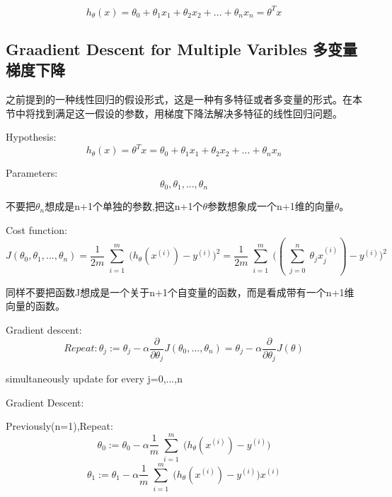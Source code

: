 \documentclass[UTF8]{ctexart}
\begin{document}
\begin{equation*}
  h_\theta(x) = \theta_0 + \theta_1x_1 + \theta_2x_2 + ...+ \theta_nx_n
  =\theta^{T}x
\end{equation*}

\subsection{Graadient Descent for Multiple Varibles 多变量梯度下降}
之前提到的一种线性回归的假设形式，这是一种有多特征或者多变量的形式。在本节中将找到满足这一假设的参数，用梯度下降法解决多特征的线性回归问题。

Hypothesis:
\begin{equation*}
  h_\theta(x) =\theta^{T}x = \theta_0 + \theta_1x_1 + \theta_2x_2 + ...+ \theta_nx_n
\end{equation*}

Parameters:
\begin{equation*}
  \theta_0,\theta_1,...,\theta_n
\end{equation*}

不要把$\theta_n$想成是n+1个单独的参数,把这n+1个$\theta$参数想象成一个n+1维的向量$\theta$。

Cost function:
\begin{equation*}
  J(\theta_0,\theta_1,...,\theta_n)=
  \frac{1}{2m}
  \sum^m_{\substack{i=1}}
   \Big(h_\theta(x^{(i)})-y^{(i)}\Big)^{2}
    = \frac{1}{2m}
   \sum^m_{\substack{i=1}}
    \Big((\sum^n_{\substack{j=0}}
    \theta_jx_j^{(i)})-y^{(i)}\Big)^{2}
\end{equation*}

同样不要把函数J想成是一个关于n+1个自变量的函数，而是看成带有一个n+1维向量的函数。

Gradient descent:
\begin{equation*}
Repeat:
  \theta_j := \theta_j - \alpha
  \frac{\partial}{\partial\theta_j}
  J(\theta_0,...,\theta_n)=\theta_j - \alpha
  \frac{\partial}{\partial\theta_j}J(\theta)
\end{equation*}

simultaneously update for every j=0,...,n

Gradient Descent:

Previously(n=1),Repeat:
\begin{equation*}
  \theta_0 := \theta_0 - \alpha
  \frac{1}{m}
  \sum^m_{\substack{i=1}}
   \Big(h_\theta(x^{(i)})-y^{(i)}\Big)
\end{equation*}
\begin{equation*}
  \theta_1 := \theta_1 - \alpha
  \frac{1}{m}
  \sum^m_{\substack{i=1}}
   \Big(h_\theta(x^{(i)})-y^{(i)}\Big)x^{(i)}
\end{equation*}
\end{document}
